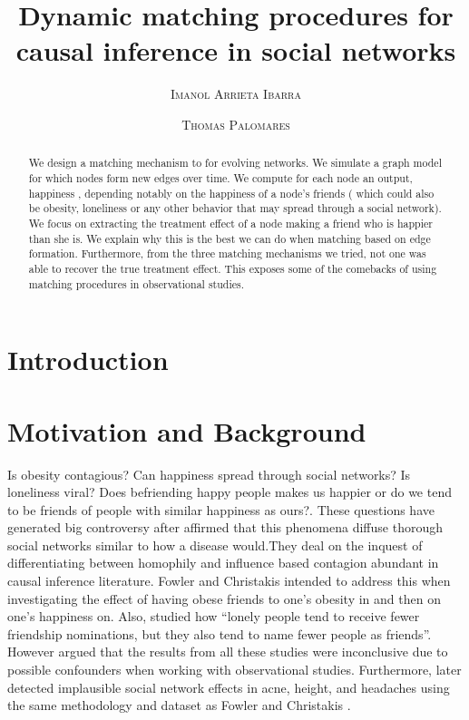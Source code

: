 \documentclass[11pt]{article}
\title{Dynamic matching procedures for causal inference in social networks}
\author{{\textsc{Imanol Arrieta Ibarra}} \\
 \and {\textsc{Thomas Palomares}} \\
}
\begin{document}
\maketitle


\begin{abstract}
We design a matching mechanism to for evolving networks. We simulate a graph model for which nodes form new edges over time. We compute for each node an output, happiness , depending notably on the happiness of a node's friends ( which could also be obesity, loneliness or any other behavior that may spread through a social network). We focus on extracting the treatment effect of a node making a friend who is happier than she is. We explain why this is the best we can do when matching based on edge formation. Furthermore, from the three matching mechanisms we tried, not one was able to recover the true treatment effect. This exposes some of the comebacks of using matching procedures in observational studies. 

\end{abstract}

\newpage

\section{Introduction}




\section{Motivation and Background}

Is obesity contagious? Can happiness spread through social networks? Is loneliness viral? Does befriending happy people makes us happier or do we tend to be friends of people with similar happiness as ours?. These questions have generated big controversy after \cite{christakis2007spread} affirmed that this phenomena diffuse thorough social networks similar to how a disease would.They deal on  the inquest of differentiating between homophily and influence based contagion abundant in causal inference literature. Fowler and Christakis intended to address this when investigating the effect of having obese friends to one’s obesity in \citep{christakis2007spread} and then on one’s happiness on. Also, \citep{cacioppo2009alone} studied how “lonely people tend to receive fewer friendship nominations, but they also tend to name fewer people as friends”. However \citep{shalizi2011homophily} argued that the results from all these studies were inconclusive due to possible confounders when working with observational studies. Furthermore, \citep{cohen2008detecting} later detected implausible social network effects in acne, height, and headaches using the same methodology and dataset as Fowler and Christakis . \\
\end{document}
